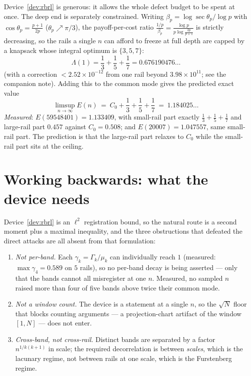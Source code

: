 \documentclass[11pt]{article}
\begin{document}
Device~\ref{dev:rbrl} is generous: it allows the whole defect budget to be spent
at once.  The deep end is separately constrained.  Writing
$\beta_p=\log\sec\theta_p/\log p$ with $\cos\theta_p=\frac{p+1}{2p}$
($\theta_p\nearrow\pi/3$), the payoff-per-cost ratio
$\frac{1/p}{\beta_p}=\frac{\log p}{p\log\frac{2p}{p+1}}$ is strictly decreasing,
so the rails a single $n$ can afford to freeze at full depth are capped by a
knapsack whose integral optimum is $\{3,5,7\}$:
\[
  \Lambda(1)=\frac13+\frac15+\frac17=0.676190476\ldots
\]
(with a correction $<2.52\times10^{-12}$ from one rail beyond
$3.98\times10^{11}$; see the companion note).  Adding this to the common mode
gives the predicted exact value
\[
  \boxed{\ \limsup_{n\to\infty}E(n)\ =\ C_0+\frac13+\frac15+\frac17\ =\ 1.184025\ldots\ }
\]
\emph{Measured}: $E(59548401)=1.133409$, with small-rail part exactly
$\frac13+\frac15+\frac17$ and large-rail part $0.457$ against $C_0=0.508$; and
$E(20007)=1.047557$, same small-rail part.  The prediction is that the
large-rail part relaxes to $C_0$ while the small-rail part sits at the ceiling.

\section{Working backwards: what the device needs}

Device~\ref{dev:rbrl} is an $\ell^2$ registration bound, so the natural route is
a second moment plus a maximal inequality, and the three obstructions that
defeated the direct attacks are all absent from that formulation:

\begin{enumerate}
\item \emph{Not per-band.} Each $\gamma_k=\Gamma_k/\mu_k$ can individually reach
$1$ (measured: $\max\gamma_4=0.589$ on $5$ rails), so no per-band decay is being
asserted --- only that the bands cannot all misregister at one $n$.  Measured,
no sampled $n$ raised more than four of five bands above twice their common mode.
\item \emph{Not a window count.}  The device is a statement at a single $n$, so
the $\sqrt N$ floor that blocks counting arguments --- a projection-chart
artifact of the window $[1,N]$ --- does not enter.
\item \emph{Cross-band, not cross-rail.}  Distinct bands are separated by a
factor $n^{1/k(k+1)}$ in scale; the required decorrelation is between
\emph{scales}, which is the lacunary regime, not between rails at one scale,
which is the Furstenberg regime.
\end{enumerate}
\end{document}
